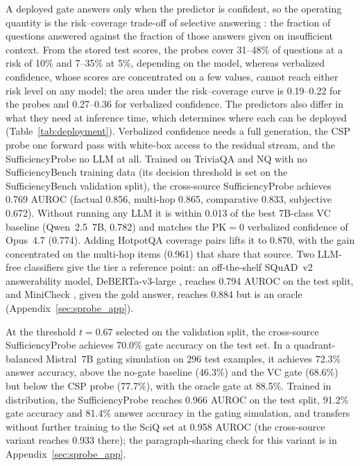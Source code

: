 \documentclass[acmsmall,screen,review]{acmart}
\newcommand{\bench}{SufficiencyBench}
\newcommand{\sprobe}{SufficiencyProbe}
\begin{document}
A deployed gate answers only when the predictor is confident, so the operating quantity is the risk--coverage trade-off of selective answering \citep{kamath2020selective}: the fraction of questions answered against the fraction of those answers given on insufficient context. From the stored test scores, the probes cover 31--48\% of questions at a risk of 10\% and 7--35\% at 5\%, depending on the model, whereas verbalized confidence, whose scores are concentrated on a few values, cannot reach either risk level on any model; the area under the risk--coverage curve is 0.19--0.22 for the probes and 0.27--0.36 for verbalized confidence. The predictors also differ in what they need at inference time, which determines where each can be deployed (Table~\ref{tab:deployment}). Verbalized confidence needs a full generation, the CSP probe one forward pass with white-box access to the residual stream, and the \sprobe{} no LLM at all. Trained on TriviaQA and NQ with no \bench{} training data (its decision threshold is set on the \bench{} validation split), the cross-source \sprobe{} achieves 0.769 AUROC (factual 0.856, multi-hop 0.865, comparative 0.833, subjective 0.672). Without running any LLM it is within 0.013 of the best 7B-class VC baseline (Qwen~2.5~7B, 0.782) and matches the PK$=$0 verbalized confidence of Opus~4.7 (0.774). Adding HotpotQA coverage pairs lifts it to 0.870, with the gain concentrated on the multi-hop items (0.961) that share that source. Two LLM-free classifiers give the tier a reference point: an off-the-shelf SQuAD~v2 answerability model, DeBERTa-v3-large \citep{he2023debertav3}, reaches 0.794 AUROC on the test split, and MiniCheck \citep{tang2024minicheck}, given the gold answer, reaches 0.884 but is an oracle (Appendix~\ref{sec:sprobe_app}).

At the threshold $t = 0.67$ selected on the validation split, the cross-source \sprobe{} achieves 70.0\% gate accuracy on the test set. In a quadrant-balanced Mistral~7B gating simulation on 296 test examples, it achieves 72.3\% answer accuracy, above the no-gate baseline (46.3\%) and the VC gate (68.6\%) but below the CSP probe (77.7\%), with the oracle gate at 88.5\%. Trained in distribution, the \sprobe{} reaches 0.966 AUROC on the test split, 91.2\% gate accuracy and 81.4\% answer accuracy in the gating simulation, and transfers without further training to the SciQ set at 0.958 AUROC (the cross-source variant reaches 0.933 there); the paragraph-sharing check for this variant is in Appendix~\ref{sec:sprobe_app}.
\end{document}
